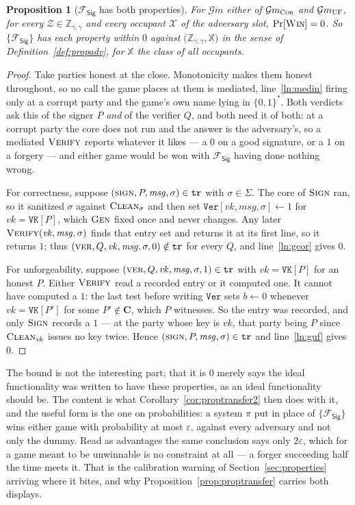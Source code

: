 \documentclass[11pt,a4paper]{article}
\newcommand{\Cs}{\mathbf{C}}
\newcommand{\Zenv}{\mathcal{Z}}
\newcommand{\ZenvSet}{\mathbb{Z}}
\newcommand{\op}[1]{\textsc{#1}}
\newcommand{\Gm}{\mathcal{G}m}
\newcommand{\Xset}{\mathbb{X}}
\newcommand{\Win}{\op{Win}}
\newcommand{\Fsig}{\mathcal{F}_{\mathsf{Sig}}}
\newcommand{\vk}{\mathit{vk}}
\newcommand{\msg}{\mathit{msg}}
\newcommand{\Sigs}{\Sigma}
\newcommand{\Clean}{\op{Clean}}
\newcommand{\V}[1]{\mathtt{#1}}
\newcommand{\bits}{\{0,1\}^*}
\theoremstyle{accentdef}
\theoremstyle{accentplain}
\newtheorem{proposition}[definition]{Proposition}
\begin{document}
\begin{proposition}[$\Fsig$ has both properties]\label{prop:sigprops}
For $\Gm$ either of $\Gm_{\op{Cor}}$ and $\Gm_{\op{UF}}$, for every $\Zenv \in \ZenvSet_{\gamma,\gamma}$
and every occupant $\mathcal{X}$ of the adversary slot, $\Pr[\Win] = 0$. So $\{\Fsig\}$ has each
property within $0$ against $\bigl(\ZenvSet_{\gamma,\gamma},\Xset\bigr)$ in the sense of
Definition~\ref{def:propadv}, for $\Xset$ the class of all occupants.
\end{proposition}

\begin{proof}
Take parties honest at the close. Monotonicity makes them honest throughout, so no call the game
places at them is mediated, line~\ref{ln:medin} firing only at a corrupt party and the game's own name
lying in $\bits$. Both verdicts ask this of the signer $P$ \emph{and} of the verifier $Q$, and both
need it of both: at a corrupt party the core does not run and the answer is the adversary's, so a
mediated $\op{Verify}$ reports whatever it likes --- a $0$ on a good signature, or a $1$ on a
forgery --- and either game would be won with $\Fsig$ having done nothing wrong.

For correctness, suppose $(\op{sign},P,\msg,\sigma) \in \V{tr}$ with $\sigma \in \Sigs$. The core of
$\op{Sign}$ ran, so it sanitized $\sigma$ against $\Clean_{\sigma}$ and then set
$\V{Ver}[\vk,\msg,\sigma] \gets 1$ for $\vk = \V{VK}[P]$, which $\op{Gen}$ fixed once and never
changes. Any later $\op{Verify}(\vk,\msg,\sigma)$ finds that entry set and returns it at its first
line, so it returns $1$; thus $(\op{ver},Q,\vk,\msg,\sigma,0) \notin \V{tr}$ for every $Q$, and
line~\ref{ln:gcor} gives $0$.

For unforgeability, suppose $(\op{ver},Q,\vk,\msg,\sigma,1) \in \V{tr}$ with
$\vk = \V{VK}[P]$ for an honest $P$. Either $\op{Verify}$ read a recorded entry or it computed one.
It cannot have computed a $1$: the last test before writing $\V{Ver}$ sets $b \gets 0$ whenever
$\vk = \V{VK}[P']$ for some $P' \notin \Cs$, which $P$ witnesses. So the entry was recorded, and only
$\op{Sign}$ records a $1$ --- at the party whose key is $\vk$, that party being $P$ since
$\Clean_{\vk}$ issues no key twice. Hence $(\op{sign},P,\msg,\sigma) \in \V{tr}$ and
line~\ref{ln:guf} gives $0$.
\end{proof}

The bound is not the interesting part; that it is $0$ merely says the ideal functionality was written
to have these properties, as an ideal functionality should be. The content is what
Corollary~\ref{cor:proptransfer2} then does with it, and the useful form is the one on
probabilities: a system $\pi$ put in place of $\{\Fsig\}$ wins either game with probability at most
$\varepsilon$, against every adversary and not only the dummy. Read as advantages the same conclusion
says only $2\varepsilon$, which for a game meant to be unwinnable is no constraint at all --- a forger
succeeding half the time meets it. That is the calibration warning of Section~\ref{sec:properties}
arriving where it bites, and why Proposition~\ref{prop:proptransfer} carries both displays.
\end{document}
